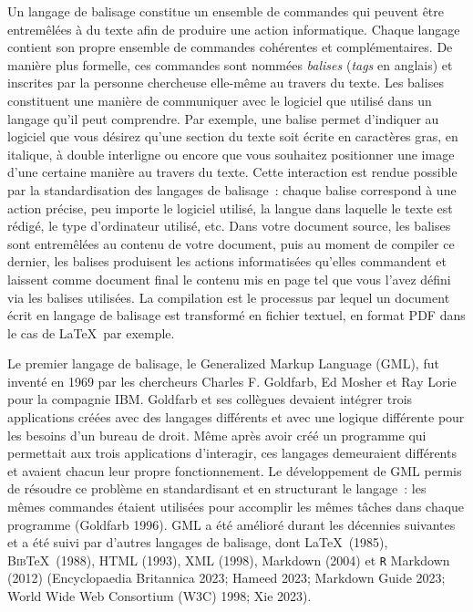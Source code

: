 \documentclass[
  letterpaper,
]{scrbook}
\begin{document}
Un langage de balisage constitue un ensemble de commandes qui peuvent
être entremêlées à du texte afin de produire une action informatique.
Chaque langage contient son propre ensemble de commandes cohérentes et
complémentaires. De manière plus formelle, ces commandes sont nommées
\emph{balises} (\emph{tags} en anglais) et inscrites par la personne
chercheuse elle-même au travers du texte. Les balises constituent une
manière de communiquer avec le logiciel que utilisé dans un langage
qu'il peut comprendre. Par exemple, une balise permet d'indiquer au
logiciel que vous désirez qu'une section du texte soit écrite en
caractères gras, en italique, à double interligne ou encore que vous
souhaitez positionner une image d'une certaine manière au travers du
texte. Cette interaction est rendue possible par la standardisation des
langages de balisage~: chaque balise correspond à une action précise,
peu importe le logiciel utilisé, la langue dans laquelle le texte est
rédigé, le type d'ordinateur utilisé, etc. Dans votre document source,
les balises sont entremêlées au contenu de votre document, puis au
moment de compiler ce dernier, les balises produisent les actions
informatisées qu'elles commandent et laissent comme document final le
contenu mis en page tel que vous l'avez défini via les balises
utilisées. La compilation est le processus par lequel un document écrit
en langage de balisage est transformé en fichier textuel, en format PDF
dans le cas de \LaTeX~par exemple.

Le premier langage de balisage, le Generalized Markup Language (GML),
fut inventé en 1969 par les chercheurs Charles F. Goldfarb, Ed Mosher et
Ray Lorie pour la compagnie IBM. Goldfarb et ses collègues devaient
intégrer trois applications créées avec des langages différents et avec
une logique différente pour les besoins d'un bureau de droit. Même après
avoir créé un programme qui permettait aux trois applications
d'interagir, ces langages demeuraient différents et avaient chacun leur
propre fonctionnement. Le développement de GML permis de résoudre ce
problème en standardisant et en structurant le langage~: les mêmes
commandes étaient utilisées pour accomplir les mêmes tâches dans chaque
programme (Goldfarb 1996). GML a été amélioré durant les décennies
suivantes et a été suivi par d'autres langages de balisage, dont
\LaTeX~(1985), \textsc{Bib}\TeX~(1988), HTML (1993), XML (1998),
Markdown (2004) et \texttt{R} Markdown (2012) (Encyclopaedia Britannica
2023; Hameed 2023; Markdown Guide 2023; World Wide Web Consortium (W3C)
1998; Xie 2023).
\end{document}
